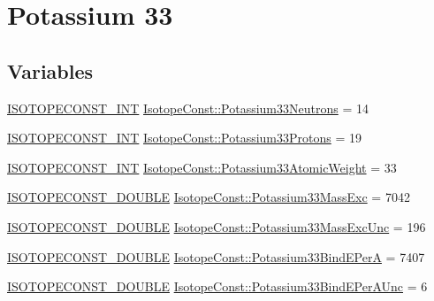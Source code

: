 \hypertarget{group___isotope_const-_potassium-_k33}{}\section{Potassium 33}
\label{group___isotope_const-_potassium-_k33}
\subsection*{Variables}
\begin{DoxyCompactItemize}
\item 
\mbox{\hyperlink{group___isotope_const-_macros_ga5f18360b3e99483a35c32d789e62621c}{I\+S\+O\+T\+O\+P\+E\+C\+O\+N\+S\+T\+\_\+\+I\+NT}} \mbox{\hyperlink{group___isotope_const-_potassium-_k33_gab98459ea6faa8541f8be8dc4f3eb09ea}{Isotope\+Const\+::\+Potassium33\+Neutrons}} = 14
\item 
\mbox{\hyperlink{group___isotope_const-_macros_ga5f18360b3e99483a35c32d789e62621c}{I\+S\+O\+T\+O\+P\+E\+C\+O\+N\+S\+T\+\_\+\+I\+NT}} \mbox{\hyperlink{group___isotope_const-_potassium-_k33_ga6615a89c387b9fd40715a210d3ead4a8}{Isotope\+Const\+::\+Potassium33\+Protons}} = 19
\item 
\mbox{\hyperlink{group___isotope_const-_macros_ga5f18360b3e99483a35c32d789e62621c}{I\+S\+O\+T\+O\+P\+E\+C\+O\+N\+S\+T\+\_\+\+I\+NT}} \mbox{\hyperlink{group___isotope_const-_potassium-_k33_ga2d356252fa624c87ce43b75071e71a99}{Isotope\+Const\+::\+Potassium33\+Atomic\+Weight}} = 33
\item 
\mbox{\hyperlink{group___isotope_const-_macros_ga8f45a7272ce02c0b4c65c44636ed719a}{I\+S\+O\+T\+O\+P\+E\+C\+O\+N\+S\+T\+\_\+\+D\+O\+U\+B\+LE}} \mbox{\hyperlink{group___isotope_const-_potassium-_k33_gae986fddb59b0a3cd829b3553baf6752f}{Isotope\+Const\+::\+Potassium33\+Mass\+Exc}} = 7042
\item 
\mbox{\hyperlink{group___isotope_const-_macros_ga8f45a7272ce02c0b4c65c44636ed719a}{I\+S\+O\+T\+O\+P\+E\+C\+O\+N\+S\+T\+\_\+\+D\+O\+U\+B\+LE}} \mbox{\hyperlink{group___isotope_const-_potassium-_k33_gad827332aa09db0661439c123ecc197ab}{Isotope\+Const\+::\+Potassium33\+Mass\+Exc\+Unc}} = 196
\item 
\mbox{\hyperlink{group___isotope_const-_macros_ga8f45a7272ce02c0b4c65c44636ed719a}{I\+S\+O\+T\+O\+P\+E\+C\+O\+N\+S\+T\+\_\+\+D\+O\+U\+B\+LE}} \mbox{\hyperlink{group___isotope_const-_potassium-_k33_ga71ea69c9b9591d178f64aefdefdd5fcd}{Isotope\+Const\+::\+Potassium33\+Bind\+E\+PerA}} = 7407
\item 
\mbox{\hyperlink{group___isotope_const-_macros_ga8f45a7272ce02c0b4c65c44636ed719a}{I\+S\+O\+T\+O\+P\+E\+C\+O\+N\+S\+T\+\_\+\+D\+O\+U\+B\+LE}} \mbox{\hyperlink{group___isotope_const-_potassium-_k33_ga1b28e1f05c3ef83cb12e4a3ba5aed251}{Isotope\+Const\+::\+Potassium33\+Bind\+E\+Per\+A\+Unc}} = 6

\end{DoxyCompactItemize}
